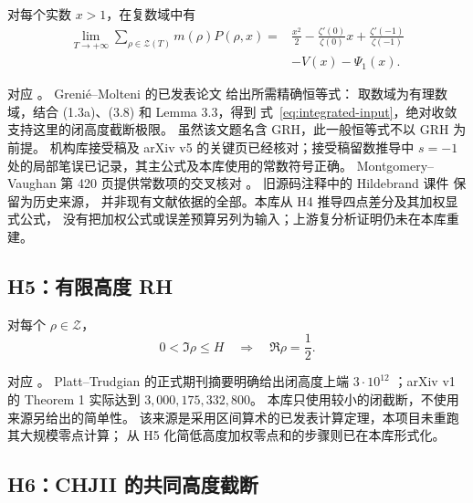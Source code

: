 \begin{definition}[H4：高度截断的积分显式公式]
\label{hyp:integrated}
对每个实数 $x>1$，在复数域中有
\begin{equation}
\label{eq:integrated-input}
\begin{split}
\lim_{T\to+\infty}\sum_{\rho\in\mathcal Z(T)}m(\rho)P(\rho,x)
={}&\frac{x^2}{2}-\frac{\zeta'(0)}{\zeta(0)}x
+\frac{\zeta'(-1)}{\zeta(-1)}\\
&-V(x)-\Psi_1(x).
\end{split}
\end{equation}
\end{definition}
对应 。
Greni\'e--Molteni 的已发表论文 \cite{GM2016} 给出所需精确恒等式：
取数域为有理数域，结合 (1.3a)、(3.8) 和 Lemma 3.3，得到
式~\eqref{eq:integrated-input}，绝对收敛支持这里的闭高度截断极限。
虽然该文题名含 GRH，此一般恒等式不以 GRH 为前提。
机构库接受稿及 arXiv v5 的关键页已经核对；接受稿留数推导中
$s=-1$ 处的局部笔误已记录，其主公式及本库使用的常数符号正确。
Montgomery--Vaughan 第 420 页提供常数项的交叉核对
\cite{MontgomeryVaughan}。
旧源码注释中的 Hildebrand 课件 \cite{Hildebrand} 保留为历史来源，
并非现有文献依据的全部。本库从 H4 推导四点差分及其加权显式公式，
没有把加权公式或误差预算另列为输入；上游复分析证明仍未在本库重建。

\subsection{H5：有限高度 RH}

\begin{definition}
\label{hyp:finite-rh}
对每个 $\rho\in\mathcal Z$，
\[
0<\Im\rho\le H\quad\Longrightarrow\quad\Re\rho=\frac12.
\]
\end{definition}
对应 。
Platt--Trudgian 的正式期刊摘要明确给出闭高度上端
$3\cdot10^{12}$ \cite{PlattTrudgian}；arXiv v1 的 Theorem 1
实际达到 $3{,}000{,}175{,}332{,}800$。
本库只使用较小的闭截断，不使用来源另给出的简单性。
该来源是采用区间算术的已发表计算定理，本项目未重跑其大规模零点计算；
从 H5 化简低高度加权零点和的步骤则已在本库形式化。

\subsection{H6：CHJII 的共同高度截断}

